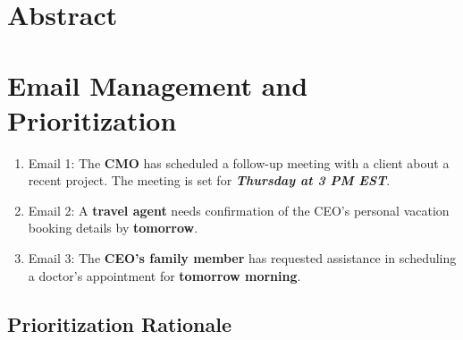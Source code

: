 \documentclass{article}
\begin{document}
\section{\centering Abstract} 

\section{Email Management and Prioritization}
\begin{enumerate}
    \item Email 1: The \textbf{CMO} has scheduled a follow-up meeting with a client about a recent project. The meeting is set for \textit{\textbf{Thursday at 3 PM EST}}.
    \item Email 2: A \textbf{travel agent} needs confirmation of the CEO's personal vacation booking details by \textbf{tomorrow}.
    \item Email 3: The \textbf{CEO’s family member} has requested assistance in scheduling a doctor’s appointment for \textbf{tomorrow morning}.
\end{enumerate}

\subsection{Prioritization Rationale}
\end{document}
